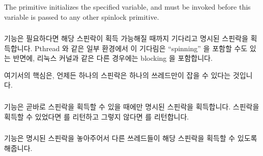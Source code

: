 The  primitive initializes the specified
 variable, and must be invoked before
this variable is passed to any other spinlock primitive.
\fi

\subsubsection{}

 기능은 필요하다면 해당 스핀락이 획득 가능해질 때까지 기다리고
명시된 스핀락을 획득합니다.
Pthread 와 같은 일부 환경에서 이 기다림은 ``spinning'' 을 포함할 수도 있는
반면에, 리눅스 커널과 같은 다른 경우에는 blocking 을 포함합니다.

여기서의 핵심은, 언제든 하나의 스핀락은 하나의 쓰레드만이 잡을 수 있다는
것입니다.

\subsubsection{}

 기능은 곧바로 스핀락을 획득할 수 있을 때에만 명시된
스핀락을 획득합니다.
스핀락을 획득할 수 있었다면  를 리턴하고 그렇지 않다면  를
리턴합니다.

\subsubsection{}

 기능은 명시된 스핀락을 놓아주어서 다른 쓰레드들이 해당
스핀락을 획득할 수 있도록 해줍니다.

